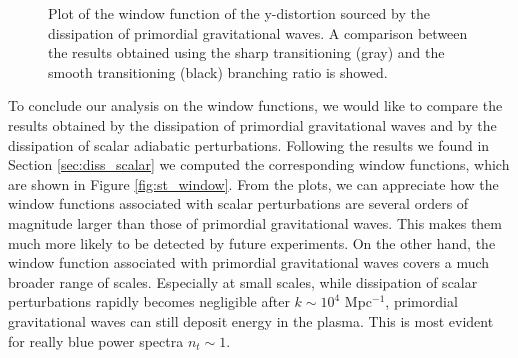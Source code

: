 \begin{figure}
    \centering
{}
\caption{Plot of the window function of the y-distortion sourced by the dissipation of primordial gravitational waves. A comparison between the results obtained using the sharp transitioning (gray) and the smooth transitioning (black) branching ratio is showed.}
\label{fig:y_window}
\end{figure}
To conclude our analysis on the window functions, we would like to compare the results obtained by the dissipation of primordial gravitational waves and by the dissipation of scalar adiabatic perturbations. Following the results we found in Section \ref{sec:diss_scalar} we computed the corresponding window functions, which are shown in Figure \ref{fig:st_window}. From the plots, we can appreciate how the window functions associated with scalar perturbations are several orders of magnitude larger than those of primordial gravitational waves. This makes them much more likely to be detected by future experiments. On the other hand, the window function associated with primordial gravitational waves covers a much broader range of scales. Especially at small scales, while dissipation of scalar perturbations rapidly becomes negligible after $k\sim10^{4}$ Mpc$^{-1}$, primordial gravitational waves can still deposit energy in the plasma. This is most evident for really blue power spectra $n_t\sim1$.


